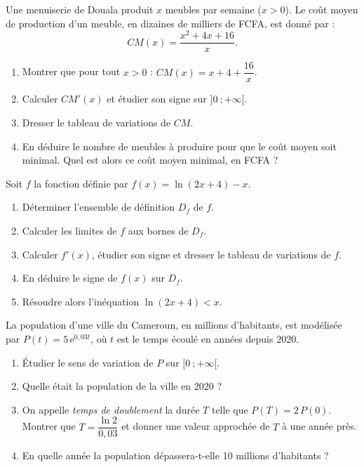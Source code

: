 \documentclass[11pt]{article}
\begin{document}
\begin{exercice}
Une menuiserie de Douala produit $x$ meubles par semaine ($x > 0$). Le coût moyen de production d'un meuble, en dizaines de milliers de FCFA, est donné par :
\[ CM(x) = \dfrac{x^2 + 4x + 16}{x}. \]
\begin{enumerate}
\item Montrer que pour tout $x > 0$ : $CM(x) = x + 4 + \dfrac{16}{x}$.
\item Calculer $CM'(x)$ et étudier son signe sur $]0\ ; +\infty[$.
\item Dresser le tableau de variations de $CM$.
\item En déduire le nombre de meubles à produire pour que le coût moyen soit minimal. Quel est alors ce coût moyen minimal, en FCFA ?
\end{enumerate}
\end{exercice}

\begin{exercice}
Soit $f$ la fonction définie par $f(x) = \ln(2x + 4) - x$.
\begin{enumerate}
\item Déterminer l'ensemble de définition $D_f$ de $f$.
\item Calculer les limites de $f$ aux bornes de $D_f$.
\item Calculer $f'(x)$, étudier son signe et dresser le tableau de variations de $f$.
\item En déduire le signe de $f(x)$ sur $D_f$.
\item Résoudre alors l'inéquation $\ln(2x + 4) < x$.
\end{enumerate}
\end{exercice}

\begin{exercice}
La population d'une ville du Cameroun, en millions d'habitants, est modélisée par $P(t) = 5\,\mathrm{e}^{0{,}03t}$, où $t$ est le temps écoulé en années depuis 2020.
\begin{enumerate}
\item Étudier le sens de variation de $P$ sur $[0\ ; +\infty[$.
\item Quelle était la population de la ville en 2020 ?
\item On appelle \emph{temps de doublement} la durée $T$ telle que $P(T) = 2\,P(0)$. Montrer que $T = \dfrac{\ln 2}{0{,}03}$ et donner une valeur approchée de $T$ à une année près.
\item En quelle année la population dépassera-t-elle 10 millions d'habitants ?
\end{enumerate}
\end{exercice}
\end{document}
